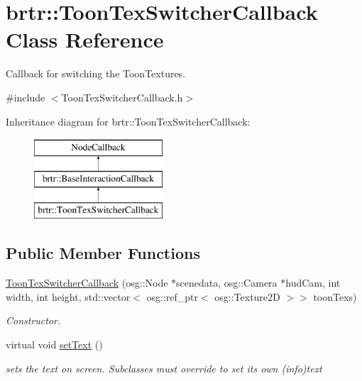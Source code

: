 \hypertarget{classbrtr_1_1_toon_tex_switcher_callback}{\section{brtr\+:\+:Toon\+Tex\+Switcher\+Callback Class Reference}
\label{classbrtr_1_1_toon_tex_switcher_callback}
}


Callback for switching the Toon\+Textures.  




{\ttfamily \#include $<$Toon\+Tex\+Switcher\+Callback.\+h$>$}

Inheritance diagram for brtr\+:\+:Toon\+Tex\+Switcher\+Callback\+:\begin{figure}[H]
\begin{center}
\leavevmode
\includegraphics[height=3.000000cm]{classbrtr_1_1_toon_tex_switcher_callback}
\end{center}
\end{figure}
\subsection*{Public Member Functions}
\begin{DoxyCompactItemize}
\item 
\hyperlink{classbrtr_1_1_toon_tex_switcher_callback_ae117afe5056c885a625a850e1d0fbae7}{Toon\+Tex\+Switcher\+Callback} (osg\+::\+Node $\ast$scenedata, osg\+::\+Camera $\ast$hud\+Cam, int width, int height, std\+::vector$<$ osg\+::ref\+\_\+ptr$<$ osg\+::\+Texture2\+D $>$$>$ toon\+Texs)
\begin{DoxyCompactList}\small\item\em Constructor. \end{DoxyCompactList}\item 
virtual void \hyperlink{classbrtr_1_1_toon_tex_switcher_callback_aad13301231829b5c28f14910d4d44355}{set\+Text} ()
\begin{DoxyCompactList}\small\item\em sets the text on screen. Subclasses must override to set its own (info)text \end{DoxyCompactList}\end{DoxyCompactItemize}
